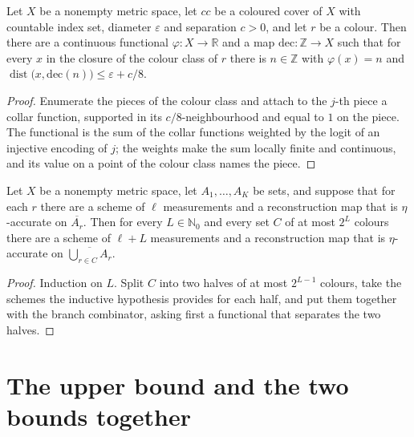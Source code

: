 \begin{theorem}
\label{thm:identification}
\leanok
{}
Let $X$ be a nonempty metric space, let $cc$ be a coloured cover of $X$ with countable
index set, diameter $\varepsilon$ and separation $c > 0$, and let $r$ be a colour.
Then there are a continuous functional $\varphi : X \to \mathbb{R}$ and a map
$\mathrm{dec} : \mathbb{Z} \to X$ such that for every $x$ in the closure of the colour
class of $r$ there is $n \in \mathbb{Z}$ with $\varphi(x) = n$ and
$\operatorname{dist}\bigl( x, \mathrm{dec}(n) \bigr) \le \varepsilon + c/8$.
\end{theorem}
\begin{proof}
\leanok
{}
Enumerate the pieces of the colour class and attach to the $j$-th piece a collar
function, supported in its $c/8$-neighbourhood and equal to $1$ on the piece. The
functional is the sum of the collar functions weighted by the logit of an injective
encoding of $j$; the weights make the sum locally finite and continuous, and its value
on a point of the colour class names the piece.
\end{proof}

\begin{theorem}
\label{thm:bisection}
\leanok
{}
Let $X$ be a nonempty metric space, let $A_1, \dots, A_{K}$ be sets, and suppose that
for each $r$ there are a scheme of $\ell$ measurements and a reconstruction map that is
$\eta$-accurate on $\overline{A_r}$. Then for every $L \in \mathbb{N}_0$ and every set
$C$ of at most $2^L$ colours there are a scheme of $\ell + L$ measurements and a
reconstruction map that is $\eta$-accurate on $\overline{\bigcup_{r \in C} A_r}$.
\end{theorem}
\begin{proof}
\leanok
{}
Induction on $L$. Split $C$ into two halves of at most $2^{L-1}$ colours, take the
schemes the inductive hypothesis provides for each half, and put them together with the
branch combinator, asking first a functional that separates the two halves.
\end{proof}

\chapter{The upper bound and the two bounds together}
\label{ch:upper}

